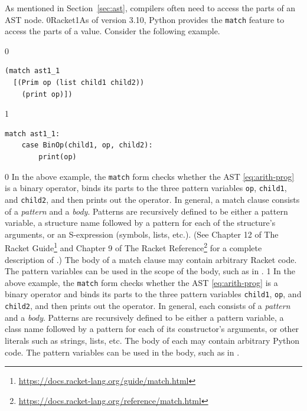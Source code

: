 \documentclass[7x10,nocrop]{TimesAPriori_MIT}%
\def\racketEd{0}
\def\pythonEd{1}
\def\edition{1}
\newcommand{\racket}[1]{{\if\edition\racketEd{#1}\fi}}
\newcommand{\python}[1]{{\if\edition\pythonEd #1\fi}}
\begin{document}
As mentioned in Section~\ref{sec:ast}, compilers often need to access
the parts of an AST node. \racket{Racket}\python{As of version 3.10, Python} provides the
\texttt{match} feature to access the parts of a value.
Consider the following example.  
\begin{center}
\begin{minipage}{0.5\textwidth}
{\if\edition\racketEd
\begin{lstlisting}
(match ast1_1
  [(Prim op (list child1 child2))
    (print op)])
\end{lstlisting}
\fi}
{\if\edition\pythonEd
\begin{lstlisting}
match ast1_1:
    case BinOp(child1, op, child2):
        print(op)
\end{lstlisting}
\fi}  
\end{minipage}
\end{center}

{\if\edition\racketEd
%
In the above example, the \texttt{match} form checks whether the AST
\eqref{eq:arith-prog} is a binary operator, binds its parts to the
three pattern variables \texttt{op}, \texttt{child1}, and
\texttt{child2}, and then prints out the operator. In general, a match
clause consists of a \emph{pattern} and a
\emph{body}. Patterns are recursively defined
to be either a pattern variable, a structure name followed by a
pattern for each of the structure's arguments, or an S-expression
(symbols, lists, etc.).  (See Chapter 12 of The Racket
Guide\footnote{\url{https://docs.racket-lang.org/guide/match.html}}
and Chapter 9 of The Racket
Reference\footnote{\url{https://docs.racket-lang.org/reference/match.html}}
for a complete description of .)
%
The body of a match clause may contain arbitrary Racket code.  The
pattern variables can be used in the scope of the body, such as
 in .
%
\fi}
%
%
{\if\edition\pythonEd
%  
In the above example, the \texttt{match} form checks whether the AST
\eqref{eq:arith-prog} is a binary operator and binds its parts to the
three pattern variables \texttt{child1}, \texttt{op}, and
\texttt{child2}, and then prints out the operator. In general, each
 consists of a \emph{pattern} and a
\emph{body}. Patterns are recursively defined
to be either a pattern variable, a class name followed by a pattern
for each of its constructor's arguments, or other literals such as
strings, lists, etc.
%
The body of each  may contain arbitrary Python code. The
pattern variables can be used in the body, such as  in
.
%
\fi}
\end{document}
